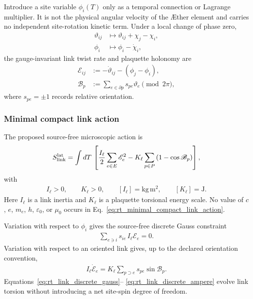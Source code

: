 Introduce a site variable $\phi_i(T)$ only as a temporal connection or Lagrange
multiplier.  It is not the physical angular velocity of the \AE ther element and
carries no independent site-rotation kinetic term.  Under a local change of
phase zero,
\begin{align}
    \vartheta_{ij}
    &\mapsto
    \vartheta_{ij}+\chi_j-\chi_i,
    \\
    \phi_i
    &\mapsto
    \phi_i-\dot\chi_i,
    \label{eq:rt_link_gauge_transformation}
\end{align}
the gauge-invariant link twist rate and plaquette holonomy are
\begin{align}
    \mathscr E_{ij}
    &:=-\dot\vartheta_{ij}-(\phi_j-\phi_i),
    \label{eq:rt_link_electric_variable}
    \\
    \mathscr B_p
    &:={\sum}_{e\in\partial p}s_{pe}\vartheta_e
    \pmod{2\pi},
    \label{eq:rt_link_plaquette_holonomy}
\end{align}
where $s_{pe}=\pm1$ records relative orientation.

\subsubsection{Minimal compact link action}

The proposed source-free microscopic action is
\begin{align}
    S_{\rm link}^{\rm lat}
    =
    \int dT\,
    \left[
        \frac{I_\ell}{2}
        \sum_{e\in E}\mathscr E_e^2
        -
        K_\ell
        \sum_{p\in P}
        \left(1-\cos\mathscr B_p\right)
    \right],
    \label{eq:rt_minimal_compact_link_action}
\end{align}
with
\begin{align}
    I_\ell>0,
    \qquad
    K_\ell>0,
    \qquad
    [I_\ell]=\mathrm{kg\,m^2},
    \qquad
    [K_\ell]=\mathrm{J}.
    \label{eq:rt_link_parameter_dimensions}
\end{align}
Here $I_\ell$ is a link inertia and $K_\ell$ is a plaquette torsional energy
scale.  No value of $c$, $e$, $m_e$, $h$, $\varepsilon_0$, or $\mu_0$ occurs in
Eq.~\eqref{eq:rt_minimal_compact_link_action}.

Variation with respect to $\phi_i$ gives the source-free discrete Gauss
constraint
\begin{align}
    \sum_{e\ni i}s_{ie}\,I_\ell\mathscr E_e=0.
    \label{eq:rt_link_discrete_gauss}
\end{align}
Variation with respect to an oriented link gives, up to the declared orientation
convention,
\begin{align}
    I_\ell\dot{\mathscr E}_e
    =
    K_\ell
    \sum_{p\supset e}s_{pe}\sin\mathscr B_p.
    \label{eq:rt_link_discrete_ampere}
\end{align}
Equations~\eqref{eq:rt_link_discrete_gauss}--
\eqref{eq:rt_link_discrete_ampere} evolve link torsion without introducing a
net site-spin degree of freedom.

